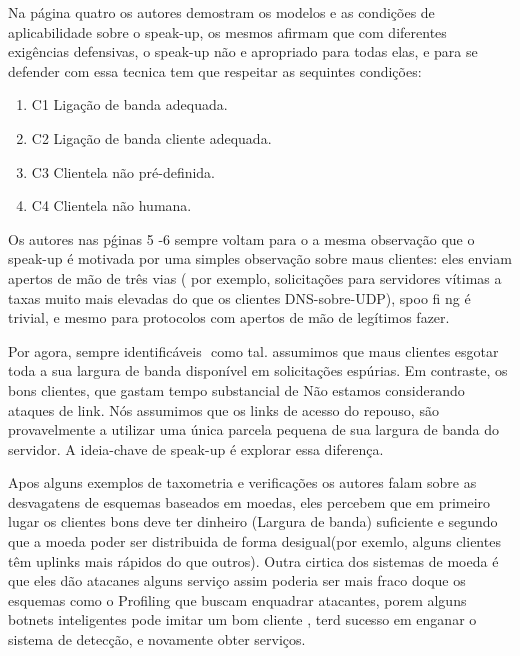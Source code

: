 \documentclass[a4paper,12pt]{article}
\begin{document}
Na página quatro os autores demostram os modelos e as condições de aplicabilidade sobre o  speak-up, os mesmos afirmam que com diferentes exigências defensivas, o speak-up não e apropriado para todas elas, e para se defender com essa tecnica tem que respeitar as sequintes condições: 
\vspace{1cm}
\begin{enumerate}
	\item{C1} Ligação de banda adequada.

	\item{C2} Ligação de banda cliente adequada.

	\item{C3} Clientela não pré-definida.

	\item{C4} Clientela não humana.

\end{enumerate}
 
 Os autores nas pǵinas 5 -6 sempre voltam para o a mesma observação que o speak-up é motivada por uma simples observação sobre maus clientes: eles enviam
 apertos de mão de três vias ( por exemplo,
 solicitações para servidores vítimas a taxas muito mais elevadas do que os clientes
 DNS-sobre-UDP), spoo fi ng é trivial, e mesmo para protocolos com apertos de mão de
 legítimos fazer.
 
 \vspace{0.5cm}
 
 Por agora,
 sempre identificáveis ​ como tal.
 assumimos que maus clientes esgotar toda a sua largura de banda disponível em
 solicitações espúrias. Em contraste, os bons clientes, que gastam tempo substancial de
 Não estamos considerando ataques de link. Nós assumimos que os links de acesso do
 repouso, são provavelmente a utilizar uma única parcela pequena de sua largura de banda
 do servidor. A ideia-chave de speak-up é explorar essa diferença.
 \vspace{0.5cm}
 
 Apos alguns exemplos de taxometria e verificações os autores falam sobre as desvagatens de esquemas baseados em moedas, eles percebem que em primeiro lugar os clientes bons deve ter dinheiro (Largura de banda) suficiente e segundo que a moeda poder ser distribuida de forma desigual(por exemlo, alguns clientes têm uplinks mais rápidos do que outros). Outra cirtica dos sistemas de moeda é que eles dão atacanes alguns serviço assim poderia ser mais fraco doque os esquemas como o Profiling que buscam enquadrar atacantes, porem alguns botnets inteligentes pode imitar um bom cliente , terd sucesso em enganar o sistema de detecção, e novamente obter serviços.
 
\end{document}
